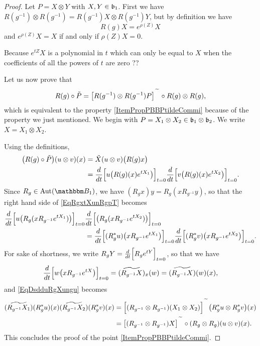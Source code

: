 \begin{proof}
	Let $P=X\otimes Y$ with $X,Y\in\mathfrak{b}_1$. First we have $R(g^{-1})\otimes R(g^{-1})=R(g^{-1})X\otimes R(g^{-1})Y$, but by definition we have
	\begin{equation}
		R(g)X= e^{\rho(Z)}X
	\end{equation}
	and $ e^{\rho(Z)}X=X$ if and only if $\rho(Z)X=0$.
	\begin{probleme}
		Because $ e^{tZ}X$ is a polynomial in $t$ which can only be equal to $X$ when the coefficients of all the powers of $t$ are zero ??
	\end{probleme}

	Let us now prove that 
	\begin{equation}
		R(g)\circ\tilde P=\big[ R(g^{-1})\otimes R(g^{-1})P \big]^{\expotilde}\circ R(g)\otimes R(g),
	\end{equation}
	which is equivalent to the property \ref{ItemPropPBBPtildeCommi} because of the property we just mentioned. We begin with $P=X_1\otimes X_2\in\mathfrak{b}_1\otimes \mathfrak{b}_2$. We write $X=X_1\otimes X_2$.

	Using the definitions,
	\begin{equation}		\label{EqRgxtXunRgpT}
		\begin{aligned}[]
			\big( R(g)\circ \tilde P \big)(u\otimes v)(x)&=\tilde X(u\otimes v)\big( R(g)x \big)\\
			&=\Dsdd{ u\big( R(g)(x) e^{tX_1} \big) }{t}{0}\Dsdd{ v\big( R(g)(x) e^{tX_2} \big) }{t}{0}.
		\end{aligned}
	\end{equation}
	Since $R_g\in\Aut(\eB_1)$, we have $(R_gx)y=R_g(xR_{g^{-1}}y)$, so that the right hand side of \eqref{EqRgxtXunRgpT} becomes
	\begin{equation}	\label{EqDsdduRgXungu}
		\begin{aligned}[]
			\Dsdd{ u\big( R_g(xR_{g^{-1}} e^{tX_1}) \big) }{t}{0}&\Dsdd{ \big(   R_g(xR_{g^{-1}} e^{tX_2})    \big) }{t}{0}\\
			&=\Dsdd{ (R^*_gu)\big( xR_{g^{-1}} e^{tX_1}\big)}{t}{0}\Dsdd{ (R^*_gv)\big( xR_{g^{-1}} e^{tX_2} \big) }{t}{0}.
		\end{aligned}
	\end{equation}
	For sake of shortness, we write $R_gY=\frac{d}{dt}\Big[ R_g e^{tY} \Big]_{t=0}$, so that we have
	\begin{equation}
			\frac{d}{dt}\Big[ w\big( xR_{g^{-1}} e^{tX} \big) \Big]_{t=0}=(\widetilde{ R_{g^{-1}}X })_x(w)
			=\widetilde{ (R_{g^{-1}}X) }(w)(x),
	\end{equation}
	and \eqref{EqDsdduRgXungu} becomes
	\begin{equation}
		\begin{aligned}[]
			(\widetilde{ R_{g^{-1}}X_1 })(R_g^*u)(x)(\widetilde{ R_{g^{-1}}X_2 })(R_g^*v)(x)&=\Big[ (R_{g^{-1}}\otimes R_{g^{-1}})(X_1\otimes X_2) \Big]^{\expotilde}\big( R^*_gu\otimes R^*_gv \big)(x)\\
			&=\big[ (R_{g^{-1}}\otimes R_{g^{-1}})X \big]^{\expotilde}\circ(R_g\otimes R_g)(u\otimes v)(x).
		\end{aligned}
	\end{equation}
	This concludes the proof of the point \ref{ItemPropPBBPtildeCommi}.


\end{proof}
